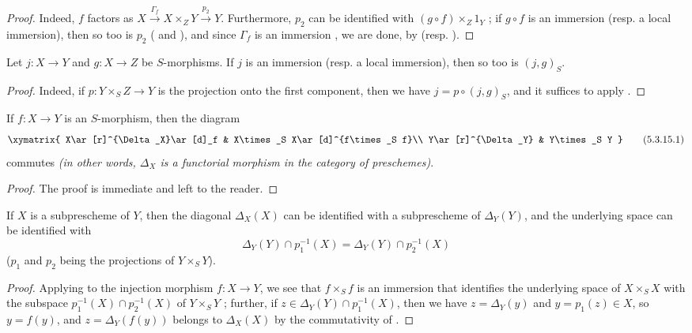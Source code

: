 \begin{proof}
Indeed, $f$ factors as $X\xrightarrow{\Gamma_f}X\times_Z Y\xrightarrow{p_2}Y$.
Furthermore, $p_2$ can be identified with $(g\circ f)\times_Z 1_Y$ ;
if $g\circ f$ is an immersion (resp. a local immersion), then so too is $p_2$ ( and ), and since $\Gamma_f$ is an immersion , we are done, by  (resp. ).
\end{proof}

\begin{corollary}[5.3.14]
\label{I.5.3.14}
Let $j:X\to Y$ and $g:X\to Z$ be $S$-morphisms.
If $j$ is an immersion (resp. a local immersion), then so too is $(j,g)_S$.
\end{corollary}

\begin{proof}
Indeed, if $p:Y\times_S Z\to Y$ is the projection onto the first component, then we have $j=p\circ(j,g)_S$, and it suffices to apply .
\end{proof}

\begin{proposition}[5.3.15]
\label{I.5.3.15}
If $f:X\to Y$ is an $S$-morphism, then the diagram
\[
\label{I.5.3.15.1}
  \xymatrix{
    X\ar[r]^{\Delta_X}\ar[d]_f &
    X\times_S X\ar[d]^{f\times_S f}\\
    Y\ar[r]^{\Delta_Y} &
    Y\times_S Y
  }\tag{5.3.15.1}
\]
commutes \emph{(in other words, $\Delta_X$ is a functorial morphism in the category of preschemes)}.
\end{proposition}

\begin{proof}
The proof is immediate and left to the reader.
\end{proof}

\begin{corollary}[5.3.16]
\label{I.5.3.16}
If $X$ is a subprescheme of $Y$, then the diagonal $\Delta_X(X)$ can be identified with a subprescheme of $\Delta_Y(Y)$, and the underlying space can be identified with
\[
  \Delta_Y(Y)\cap p_1^{-1}(X)=\Delta_Y(Y)\cap p_2^{-1}(X)
\]
($p_1$ and $p_2$ being the projections of $Y\times_S Y$).
\end{corollary}

\begin{proof}
Applying  to the injection morphism $f:X\to Y$, we see that $f\times_S f$ is an immersion that identifies the underlying space of $X\times_S X$ with the subspace $p_1^{-1}(X)\cap p_2^{-1}(X)$ of $Y\times_S Y$ ;
further, if $z\in\Delta_Y(Y)\cap p_1^{-1}(X)$, then we have $z=\Delta_Y(y)$
and $y=p_1(z)\in X$, so $y=f(y)$, and $z=\Delta_Y(f(y))$ belongs to $\Delta_X(X)$ by the commutativity of .
\end{proof}

